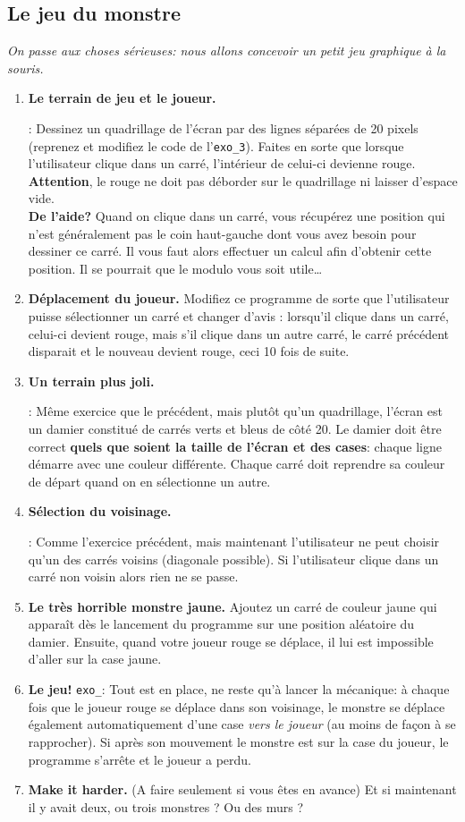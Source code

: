 \documentclass[11pt,a4paper]{article}
\newcommand{\checkbox}{$\square$ \smallskip}
\newcounter{exo} \setcounter{exo}{0}
\newenvironment{action}{%
    \begin{enumerate}[\numerotation] \addtocounter{exo}{-1}%
        }{%
    \end{enumerate}
}
\newcommand{\numexoa}{\theexo \addtocounter{exo}{1}}
\newcommand{\numerotation}{\checkbox \smallskip \numexoa.}
\newcounter{exoo} \setcounter{exoo}{0}
\newcommand{\numexo}{\theexoo}
\newcommand{\repexo}{{\tt exo_\numexo}}
\newcommand{\exoplus}{\addtocounter{exoo}{1}}
\begin{document}
\subsection*{Le jeu du monstre}
{\it On passe aux choses sérieuses: nous allons concevoir un petit jeu graphique à la souris.}
\begin{action}
\item {\bf Le terrain de jeu et le joueur. }\exoplus \repexo : Dessinez un quadrillage de l'écran par des lignes séparées de 20 pixels (reprenez et modifiez le code de l'{\tt exo_3}). Faites en sorte que lorsque l'utilisateur clique dans un carré, l'intérieur de celui-ci devienne rouge. {\bf Attention}, le rouge ne doit pas déborder sur le quadrillage ni laisser d'espace vide.\\
{\bf De l'aide?} Quand on clique dans un carré, vous récupérez une position qui n'est généralement pas le coin haut-gauche dont vous avez besoin pour dessiner ce carré. Il vous faut alors effectuer un calcul afin d'obtenir cette position. Il se pourrait que le modulo vous soit utile\dots
\item {\bf Déplacement du joueur.} Modifiez ce programme de sorte que l'utilisateur puisse \og sélectionner \fg un carré et changer d'avis : lorsqu'il clique dans un carré, celui-ci devient rouge, mais s'il clique dans un autre carré, le carré précédent disparait et le nouveau devient rouge, ceci 10 fois de suite.\\
\item {\bf Un terrain plus joli.} \exoplus \repexo : Même exercice que le précédent, mais plutôt qu'un quadrillage, l'écran est un damier constitué de carrés verts et bleus de côté 20. Le damier doit être correct {\bf quels que soient la taille de l'écran et des cases}: chaque ligne démarre avec une couleur différente. Chaque carré doit reprendre sa couleur de départ quand on en sélectionne un autre. \\
\item {\bf Sélection du voisinage.} \exoplus \repexo : Comme l'exercice précédent, mais maintenant l'utilisateur ne peut choisir qu'un des carrés voisins (diagonale possible). Si l'utilisateur clique dans un carré non voisin alors rien ne se passe.
\item {\bf Le très horrible monstre jaune.} Ajoutez un carré de couleur jaune qui apparaît dès le lancement du programme sur une position aléatoire du damier. Ensuite, quand votre joueur rouge se déplace, il lui est impossible d'aller sur la case jaune.
\item {\bf Le jeu!} \repexo:  Tout est en place, ne reste qu'à lancer la mécanique: à chaque fois que le joueur rouge se déplace dans son voisinage, le monstre se déplace également automatiquement d'une case \emph{vers le joueur} (au moins de façon à se rapprocher). Si après son mouvement le monstre est sur la case du  joueur, le programme s'arrête et le joueur a perdu.


\item {\bf Make it harder.} (A faire seulement si vous êtes en avance) Et si maintenant il y avait deux, ou trois monstres ? Ou des murs ?
\end{action}
\end{document}
